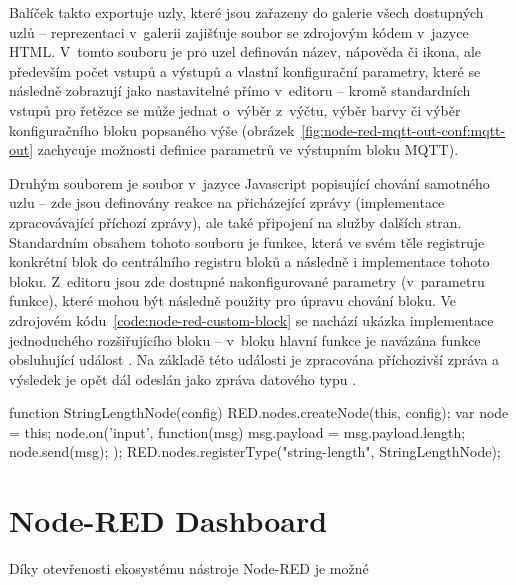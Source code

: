 Balíček takto exportuje uzly, které jsou zařazeny do galerie všech dostupných uzlů -- reprezentaci v~galerii zajišťuje
soubor se zdrojovým kódem v~jazyce HTML.
V~tomto souboru je pro uzel definován název, nápověda či ikona, ale především počet vstupů a výstupů a vlastní
konfigurační parametry, které se následně zobrazují jako nastavitelné přímo v~editoru -- kromě standardních vstupů
pro řetězce se může jednat o~výběr z~výčtu, výběr barvy či výběr konfiguračního bloku popsaného výše
(obrázek~\ref{fig:node-red-mqtt-out-conf:mqtt-out} zachycuje možnosti definice parametrů ve výstupním bloku MQTT).

Druhým souborem je soubor v~jazyce Javascript popisující chování samotného uzlu -- zde jsou definovány reakce na
přicházející zprávy (implementace zpracovávající příchozí zprávy), ale také připojení na služby dalších stran.
Standardním obsahem tohoto souboru je funkce, která ve svém těle registruje konkrétní blok do centrálního registru
bloků a následně i implementace tohoto bloku.
Z~editoru jsou zde dostupné nakonfigurované parametry (v~parametru funkce), které mohou být následně použity pro
úpravu chování bloku.
Ve zdrojovém kódu~\ref{code:node-red-custom-block} se nachází ukázka implementace jednoduchého rozšiřujícího bloku --
v~bloku hlavní funkce je navázána funkce obsluhující událost .
Na základě této události je zpracována příchozivší zpráva a výsledek je opět dál odeslán jako zpráva datového typu
.

\begin{code}[%
    caption={Ukázka implementace vlastního rozšiřujícího bloku do nástroje Node-RED -- uzel s~jedním vstupem a
výstupem, jehož funkcí je určení délky příchozí zprávy (řetězce).
\emph{Implementace pro jednoduchost neobsahuje kontrolu datových typů či práci s~konfiguračními parametry uzlu.}},
    label=code:node-red-custom-block,
    language=Javascript
]
function StringLengthNode(config) {
    RED.nodes.createNode(this, config);
    var node = this;
    node.on('input', function(msg) {
        msg.payload = msg.payload.length;
        node.send(msg);
    });
}
RED.nodes.registerType("string-length", StringLengthNode);
\end{code}

\section{Node-RED Dashboard}\label{sec:node-red-dashboard}
Díky otevřenosti ekosystému nástroje Node-RED je možné

